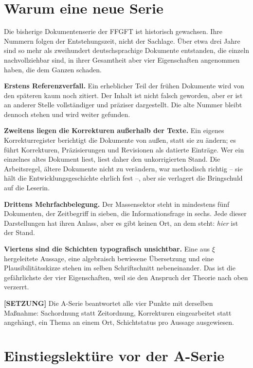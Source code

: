 \section{Warum eine neue Serie}

Die bisherige Dokumentenserie der FFGFT ist historisch gewachsen. Ihre Nummern
folgen der Entstehungszeit, nicht der Sachlage. Über etwa drei Jahre sind so
mehr als zweihundert deutschsprachige Dokumente entstanden, die einzeln
nachvollziehbar sind, in ihrer Gesamtheit aber vier Eigenschaften angenommen
haben, die dem Ganzen schaden.

\textbf{Erstens Referenzverfall.} Ein erheblicher Teil der frühen Dokumente
wird von den späteren kaum noch zitiert. Der Inhalt ist nicht falsch geworden,
aber er ist an anderer Stelle vollständiger und präziser dargestellt. Die alte
Nummer bleibt dennoch stehen und wird weiter gefunden.

\textbf{Zweitens liegen die Korrekturen außerhalb der Texte.} Ein eigenes
Korrekturregister berichtigt die Dokumente von außen, statt sie zu ändern; es
führt Korrekturen, Präzisierungen und Revisionen als datierte Einträge. Wer ein
einzelnes altes Dokument liest, liest daher den unkorrigierten Stand. Die
Arbeitsregel, ältere Dokumente nicht zu verändern, war methodisch richtig --
sie hält die Entwicklungsgeschichte ehrlich fest --, aber sie verlagert die
Bringschuld auf die Leserin.

\textbf{Drittens Mehrfachbelegung.} Der Massensektor steht in mindestens fünf
Dokumenten, der Zeitbegriff in sieben, die Informationsfrage in sechs. Jede
dieser Darstellungen hat ihren Anlass, aber es gibt keinen Ort, an dem steht:
\emph{hier} ist der Stand.

\textbf{Viertens sind die Schichten typografisch unsichtbar.} Eine aus
$\xi$ hergeleitete Aussage, eine algebraisch bewiesene Übersetzung und eine
Plausibilitätsskizze stehen im selben Schriftschnitt nebeneinander. Das ist die
gefährlichste der vier Eigenschaften, weil sie den Anspruch der Theorie nach
oben verzerrt.

\textbf{[SETZUNG]} Die A-Serie beantwortet alle vier Punkte mit derselben Maßnahme: Sachordnung
statt Zeitordnung, Korrekturen eingearbeitet statt angehängt, ein Thema an
einem Ort, Schichtstatus pro Aussage ausgewiesen.

\section{Einstiegslektüre vor der A-Serie}


